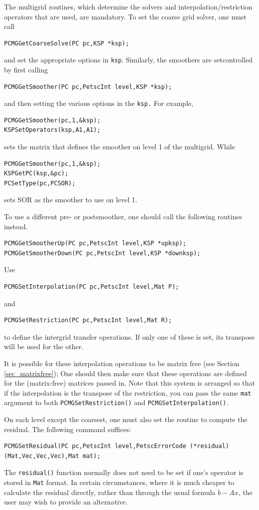 The multigrid routines, which determine
the solvers and interpolation/restriction operators that are used,
are mandatory.
To set the coarse grid solver, one must 
call
\begin{lstlisting}
PCMGGetCoarseSolve(PC pc,KSP *ksp);
\end{lstlisting}
and set the appropriate options in \lstinline{ksp}. Similarly, the
smoothers are setcontrolled by first calling
\begin{lstlisting}
PCMGGetSmoother(PC pc,PetscInt level,KSP *ksp);
\end{lstlisting}
and then setting the various options in the \lstinline{ksp.} For example,
\begin{lstlisting}
PCMGGetSmoother(pc,1,&ksp);
KSPSetOperators(ksp,A1,A1);
\end{lstlisting}
sets the matrix that defines the smoother on level 1 of the multigrid. While
\begin{lstlisting}
PCMGGetSmoother(pc,1,&ksp);
KSPGetPC(ksp,&pc);
PCSetType(pc,PCSOR);
\end{lstlisting}
sets SOR as the smoother to use on level 1.

To use a different pre- or postsmoother, one should call the following
routines instead.
\begin{lstlisting}
PCMGGetSmootherUp(PC pc,PetscInt level,KSP *upksp);
PCMGGetSmootherDown(PC pc,PetscInt level,KSP *downksp);
\end{lstlisting}

Use
\begin{lstlisting}
PCMGSetInterpolation(PC pc,PetscInt level,Mat P);
\end{lstlisting}
and
\begin{lstlisting}
PCMGSetRestriction(PC pc,PetscInt level,Mat R);
\end{lstlisting}
to define the intergrid transfer operations.  If only one of these is
set, its transpose will be used for the other.

It is possible for these interpolation operations to be matrix free
(see Section \ref{sec_matrixfree});
One should then make sure that these operations are defined for the (matrix-free) matrices
passed in.
Note that this system is arranged so that if the interpolation is
the transpose of the restriction, you can pass the same \lstinline{mat}
argument to both \lstinline{PCMGSetRestriction()} and \lstinline{PCMGSetInterpolation()}.

On each level except the coarsest, one must also set the routine to
compute the residual.  The following command suffices:
\begin{lstlisting}
PCMGSetResidual(PC pc,PetscInt level,PetscErrorCode (*residual)(Mat,Vec,Vec,Vec),Mat mat);
\end{lstlisting}
The \lstinline{residual()} function normally does not need to be set if
one's operator is stored in \lstinline{Mat} format.  In certain circumstances,
where it is much cheaper to calculate the residual directly, rather
than through the usual formula $b - Ax$,  the user may wish to provide
an alternative.

